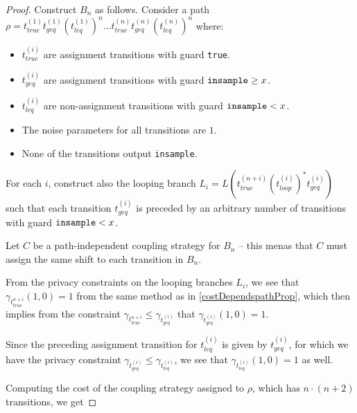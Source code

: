 \begin{proof}
    Construct $B_n$ as follows. Consider a path $\rho = t_{true}^{(1)} t_{geq}^{(1)} \left(t_{leq}^{(1)}\right)^n \dots t_{true}^{(n)} t_{geq}^{(n)} \left(t_{leq}^{(n)}\right)^n$ where:

    \begin{itemize}
        \item $t_{true}^{(i)}$ are assignment transitions with guard \texttt{true}.
        \item $t_{geq}^{(i)}$ are assignment transitions with guard $\texttt{insample}\geq x$.
        \item $t_{leq}^{(i)}$ are non-assignment transitions with guard $\texttt{insample} < x$.
        \item The noise parameters for all transitions are $1$.
        \item None of the transitions output \texttt{insample}.
    \end{itemize}

    For each $i$, construct also the looping branch $L_i = L\left(t_{true}^{(n + i)} \left(t_{loop}^{(i)}\right)^* t_{geq}^{(i)}\right)$ such that each transition $t_{geq}^{(i)}$ is preceded by an arbitrary number of transitions with guard $\texttt{insample} < x$.
    
    Let $C$ be a path-independent coupling strategy for $B_n$ -- this menas that $C$ must assign the same shift to each transition in $B_n$. 

    From the privacy constraints on the looping branches $L_i$, we see that $\gamma_{t_{true}^{n + i}}(1, 0) = 1$ from the same method as in \ref{costDependspathProp}, which then implies from the constraint $\gamma_{t_{true}^{n + i}} \leq \gamma_{t_{geq}^{(i)}}$ that $\gamma_{t_{geq}^{(i)}}(1, 0) = 1$. 

    Since the preceding assignment transition for $t_{leq}^{(i)}$ is given by $t_{geq}^{(i)}$, for which we have the privacy constraint $\gamma_{t_{geq}^{(i)}} \leq \gamma_{t_{leq}^{(i)}}$, we see that $\gamma_{t_{leq}^{(i)}}(1, 0) = 1$ as well. 

    Computing the cost of the coupling strategy assigned to $\rho$, which has $n \cdot (n + 2)$ transitions, we get 


\end{proof}
